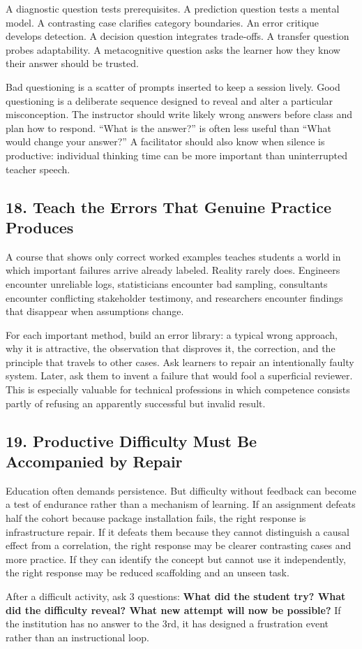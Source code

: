 A diagnostic question tests prerequisites. A prediction question tests a mental model. A contrasting case clarifies category boundaries. An error critique develops detection. A decision question integrates trade-offs. A transfer question probes adaptability. A metacognitive question asks the learner how they know their answer should be trusted.

Bad questioning is a scatter of prompts inserted to keep a session lively. Good questioning is a deliberate sequence designed to reveal and alter a particular misconception. The instructor should write likely wrong answers before class and plan how to respond. ``What is the answer?'' is often less useful than ``What would change your answer?'' A facilitator should also know when silence is productive: individual thinking time can be more important than uninterrupted teacher speech.

\subsection*{18. Teach the Errors That Genuine Practice Produces}

A course that shows only correct worked examples teaches students a world in which important failures arrive already labeled. Reality rarely does. Engineers encounter unreliable logs, statisticians encounter bad sampling, consultants encounter conflicting stakeholder testimony, and researchers encounter findings that disappear when assumptions change.

For each important method, build an error library: a typical wrong approach, why it is attractive, the observation that disproves it, the correction, and the principle that travels to other cases. Ask learners to repair an intentionally faulty system. Later, ask them to invent a failure that would fool a superficial reviewer. This is especially valuable for technical professions in which competence consists partly of refusing an apparently successful but invalid result.

\subsection*{19. Productive Difficulty Must Be Accompanied by Repair}

Education often demands persistence. But difficulty without feedback can become a test of endurance rather than a mechanism of learning. If an assignment defeats half the cohort because package installation fails, the right response is infrastructure repair. If it defeats them because they cannot distinguish a causal effect from a correlation, the right response may be clearer contrasting cases and more practice. If they can identify the concept but cannot use it independently, the right response may be reduced scaffolding and an unseen task.

After a difficult activity, ask 3 questions: \textbf{What did the student try? What did the difficulty reveal? What new attempt will now be possible?} If the institution has no answer to the 3rd, it has designed a frustration event rather than an instructional loop.
